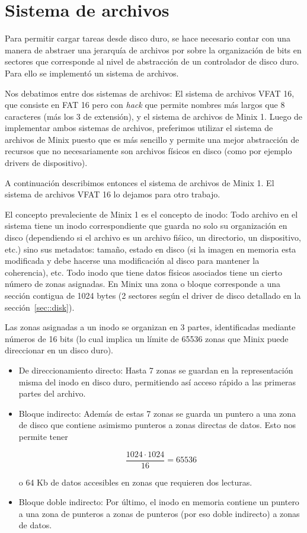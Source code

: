 \section{Sistema de archivos}
\label{sec::filesystem}

Para permitir cargar tareas desde disco duro, se hace necesario contar con una manera de
abstraer una jerarqu\'ia de archivos por sobre la organizaci\'on de bits en sectores que
corresponde al nivel de abstracci\'on de un controlador de disco duro. Para ello se
implement\'o un sistema de archivos.

Nos debatimos entre dos sistemas de archivos: El sistema de archivos VFAT 16, que consiste
en FAT 16 pero con \textit{hack} que permite nombres m\'as largos que 8 caracteres (m\'as los
3 de extensi\'on), y el sistema de archivos de Minix 1. Luego de implementar ambos sistemas de
archivos, preferimos utilizar el sistema de archivos de Minix puesto que es m\'as sencillo y
permite una mejor abstracci\'on de recursos que no necesariamente son archivos f\'isicos en disco
(como por ejemplo drivers de dispositivo).

A continuaci\'on describimos entonces el sistema de archivos de Minix 1. El sistema de archivos
VFAT 16 lo dejamos para otro trabajo.

El concepto prevaleciente de Minix 1 es el concepto de inodo: Todo archivo en el sistema tiene un
inodo correspondiente que guarda no solo su organizaci\'on en disco (dependiendo si el archivo es
un archivo fi\'sico, un directorio, un dispositivo, etc.) sino sus metadatos: tama\~no, estado en
disco (si la imagen en memoria esta modificada y debe hacerse una modificaci\'on al disco para mantener
la coherencia), etc. Todo inodo que tiene datos f\'isicos asociados tiene un cierto n\'umero de zonas 
asignadas. En Minix una zona o bloque corresponde a una secci\'on contigua de 1024 bytes (2 sectores
seg\'un el driver de disco detallado en la secci\'on~\ref{sec::disk}). 

Las zonas asignadas a un inodo se organizan en 3 partes, identificadas mediante n\'umeros de 16 bits 
(lo cual implica un l\'imite de 65536 zonas que Minix puede direccionar en un disco duro).

\begin{itemize}
	\item De direccionamiento directo: Hasta 7 zonas se guardan en la representaci\'on misma del
	inodo en disco duro, permitiendo as\'i acceso r\'apido a las primeras partes del archivo.
	\item Bloque indirecto: Adem\'as de estas 7 zonas se guarda un puntero a una zona de disco
	que contiene asimismo punteros a zonas directas de datos. Esto nos permite tener
	
	\[
		\frac{1024 \cdot 1024}{16} = 65536
	\]

	o 64 Kb de datos accesibles en zonas que requieren dos lecturas.
	\item Bloque doble indirecto: Por \'ultimo, el inodo en memoria contiene un puntero a una zona
	de punteros a zonas de punteros (por eso doble indirecto) a zonas de datos.
\end{itemize}

